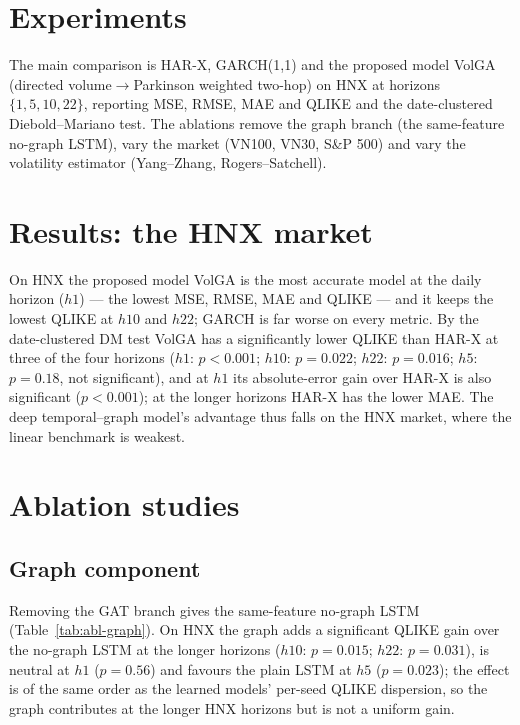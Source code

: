 \documentclass[runningheads]{llncs}
\begin{document}
\section{Experiments}
The main comparison is HAR-X, GARCH(1,1) and the proposed model VolGA (directed volume$\to$Parkinson weighted
two-hop) on HNX at horizons $\{1,5,10,22\}$, reporting MSE, RMSE, MAE and QLIKE and the date-clustered
Diebold--Mariano test. The ablations remove the graph branch (the same-feature no-graph LSTM), vary the market
(VN100, VN30, S\&P 500) and vary the volatility estimator (Yang--Zhang, Rogers--Satchell).

\section{Results: the HNX market}\label{sec:results}
\begin{table}[t]
\centering
\caption{Main result --- HNX (62{,}004 masked obs over 489 test dates at $h1$; learned models: seed mean, QLIKE
$\pm$~per-seed std). Lower is better on every metric. MSE $\times10^{-7}$, RMSE/MAE $\times10^{-4}$.}
\label{tab:main-hnx}
\footnotesize
\setlength{\tabcolsep}{5pt}

\end{table}

On HNX the proposed model VolGA is the most accurate model at the daily horizon ($h1$) --- the lowest MSE, RMSE,
MAE and QLIKE --- and it keeps the lowest QLIKE at $h10$ and $h22$; GARCH is far worse on every metric. By the
date-clustered DM test VolGA has a significantly lower QLIKE than HAR-X at three of the four horizons
($h1$: $p<0.001$; $h10$: $p=0.022$; $h22$: $p=0.016$; $h5$: $p=0.18$, not significant), and at $h1$ its
absolute-error gain over HAR-X is also significant ($p<0.001$); at the longer horizons HAR-X has the lower MAE.
The deep temporal--graph model's advantage thus falls on the HNX market, where the linear benchmark
is weakest.

\FloatBarrier
\section{Ablation studies}\label{sec:abl}
\subsection{Graph component}
Removing the GAT branch gives the same-feature no-graph LSTM (Table~\ref{tab:abl-graph}). On HNX the graph adds a
significant QLIKE gain over the no-graph LSTM at the longer horizons ($h10$: $p=0.015$; $h22$: $p=0.031$), is
neutral at $h1$ ($p=0.56$) and favours the plain LSTM at $h5$ ($p=0.023$); the effect is of the same order as
the learned models' per-seed QLIKE dispersion, so the graph contributes at the longer HNX horizons but is not a
uniform gain.
\end{document}
